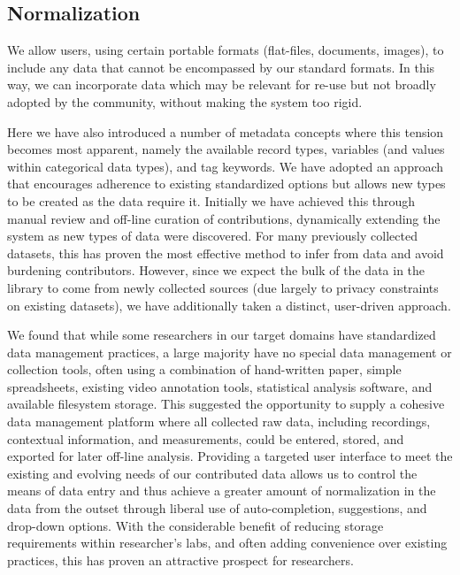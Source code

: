 \documentclass{sig-alternate}
\begin{document}
\subsection{Normalization}

We allow users, using certain portable formats (flat-files, documents, images), to include any data that cannot be encompassed by our standard formats.
In this way, we can incorporate data which may be relevant for re-use but not broadly adopted by the community, without making the system too rigid.

Here we have also introduced a number of metadata concepts where this tension becomes most apparent, namely the available record types, variables (and values within categorical data types), and tag keywords.
We have adopted an approach that encourages adherence to existing standardized options but  allows new types to be created as the data require it.
Initially we have achieved this through manual review and off-line curation of contributions, dynamically extending the system as new types of data were discovered.
For many previously collected datasets, this has proven the most effective method to infer from data and avoid burdening contributors.
However, since we expect the bulk of the data in the library to come from newly collected sources (due largely to privacy constraints on existing datasets), we have additionally taken a distinct, user-driven approach.

We found that while some researchers in our target domains have standardized data management practices, a large majority have no special data management or collection tools, often using a combination of hand-written paper, simple spreadsheets, existing video annotation tools, statistical analysis software, and available filesystem storage.
This suggested the opportunity to supply a cohesive data management platform where all collected raw data, including recordings, contextual information, and measurements, could be entered, stored, and exported for later off-line analysis.
Providing a targeted user interface to meet the existing and evolving needs of our contributed data allows us to control the means of data entry and thus achieve a greater amount of normalization in the data from the outset through liberal use of auto-completion, suggestions, and drop-down options.
With the considerable benefit of reducing storage requirements within researcher's labs, and often adding convenience over existing practices, this has proven an attractive prospect for researchers.
\end{document}
